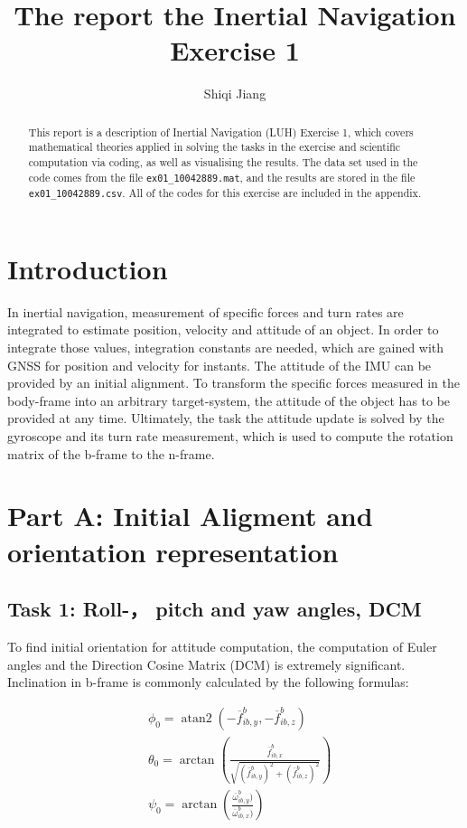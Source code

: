 \documentclass[class=article, crop=false]{standalone}
\title{The report the Inertial Navigation Exercise 1}
\author{Shiqi Jiang}
\begin{document}
\maketitle

\begin{abstract}
This report is a description of Inertial Navigation (LUH) Exercise 1, which covers mathematical theories applied in solving the tasks in the exercise and scientific computation via coding, as well as visualising the results. The data set used in the code comes from the file \verb|ex01_10042889.mat|, and the results are stored in the file \verb|ex01_10042889.csv|. All of the codes for this exercise are included in the appendix.
\end{abstract}

\section{Introduction}

In inertial navigation, measurement of specific forces and turn rates are integrated to estimate position, velocity and attitude of an object. In order to integrate those values, integration constants are needed, which are gained with GNSS for position and velocity for instants. The attitude of the IMU can be provided by an initial alignment. To transform the specific forces measured in the body-frame into an arbitrary target-system, the attitude of the object has to be provided at any time. Ultimately, the task the attitude update is solved by the gyroscope and its turn rate measurement, which is used to compute the rotation matrix of the b-frame to the n-frame.\cite{1}

\section{Part A: Initial Aligment and orientation representation}

\subsection{Task 1: Roll-， pitch and yaw angles, DCM}
To find initial orientation for attitude computation, the computation of Euler angles and the Direction Cosine Matrix (DCM) is extremely significant. Inclination in b-frame is commonly calculated by the following formulas:

\begin{center}
    \begin{subequations}
    \begin{align}
        &\phi_0 = \operatorname{atan2}{(-\overline{f}_{ib,y}^b, -\overline{f}_{ib,z}^b)} \label{1a} \\
        &\theta_0 = \arctan{(\frac{\overline{f}_{ib,x}^b}{\sqrt{(\overline{f}_{ib,y}^b)^2 + (\overline{f}_{ib,z}^b)^2}})} \label{1b} \\
        &\psi_0 = \arctan{(\frac{\overline{\omega}_{ib,y}^b)}{\overline{\omega}_{ib,x}^b)})} \label{1c}
    \end{align}
    \end{subequations}
\end{center}
\end{document}
